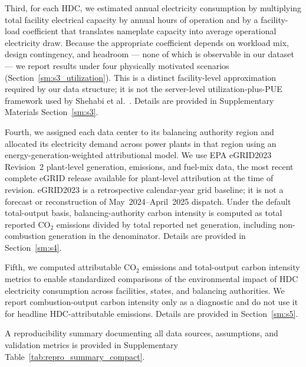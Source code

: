\documentclass[12pt]{article}
\begin{document}
Third, for each HDC, we estimated annual electricity consumption by multiplying total facility electrical capacity by annual hours of operation and by a facility-load coefficient that translates nameplate capacity into average operational electricity draw. Because the appropriate coefficient depends on workload mix, design contingency, and headroom — none of which is observable in our dataset — we report results under four physically motivated scenarios (Section~\ref{sm:s3_utilization}). This is a distinct facility-level approximation required by our data structure; it is not the server-level utilization-plus-PUE framework used by Shehabi et al.~\cite{Shehabi2016DataCenter,Shehabi2024DataCenter}. Details are provided in Supplementary Materials Section~\ref{sm:s3}.

Fourth, we assigned each data center to its balancing authority region and allocated its electricity demand across power plants in that region using an energy-generation-weighted attributional model. We use EPA eGRID2023 Revision~2 plant-level generation, emissions, and fuel-mix data, the most recent complete eGRID release available for plant-level attribution at the time of revision. eGRID2023 is a retrospective calendar-year grid baseline; it is not a forecast or reconstruction of May~2024--April~2025 dispatch. Under the default total-output basis, balancing-authority carbon intensity is computed as total reported CO$_2$ emissions divided by total reported net generation, including non-combustion generation in the denominator. Details are provided in Section~\ref{sm:s4}.

Fifth, we computed attributable CO$_2$ emissions and total-output carbon intensity metrics to enable standardized comparisons of the environmental impact of HDC electricity consumption across facilities, states, and balancing authorities. We report combustion-output carbon intensity only as a diagnostic and do not use it for headline HDC-attributable emissions. Details are provided in Section~\ref{sm:s5}.

A reproducibility summary documenting all data sources, assumptions, and validation metrics is provided in Supplementary Table~\ref{tab:repro_summary_compact}.

 
\end{document}
